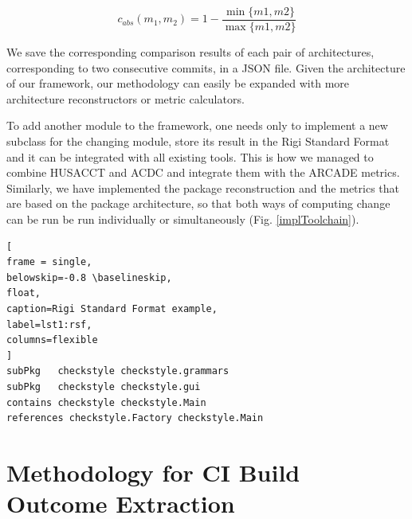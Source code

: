 \documentclass[sigplan, anonymous, review]{acmart}
\begin{document}
\begin{equation} \label{eq:absDiff}
	c_{abs}(m_1, m_2) = 1 - \frac{\min\{m1, m2\}}{\max\{m1, m2\}}
\end{equation} 


We save the corresponding comparison results of each pair of architectures, corresponding to two consecutive commits, in a JSON file. Given the architecture of our framework, our methodology can easily be expanded with more architecture reconstructors or metric calculators. 

To add another module to the framework, one needs only to implement a new subclass for the changing module, store its result in the Rigi Standard Format and it can be integrated with all existing tools. 
This is how we managed to combine HUSACCT and ACDC and integrate them with the ARCADE metrics. Similarly, we have implemented the package reconstruction and the metrics that are based on the package architecture, so that both ways of computing change can be run be run individually or simultaneously (Fig. \ref{implToolchain}).

\begin{lstlisting}[
frame = single, 
belowskip=-0.8 \baselineskip,
float,
caption=Rigi Standard Format example,
label=lst1:rsf,
columns=flexible
]
subPkg   checkstyle checkstyle.grammars
subPkg   checkstyle checkstyle.gui
contains checkstyle checkstyle.Main
references checkstyle.Factory checkstyle.Main
\end{lstlisting}

\section{Methodology for CI Build Outcome Extraction}
\label{sec:ci-build-outcome}
\end{document}
